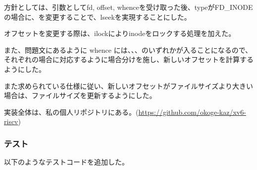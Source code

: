 \documentclass[platex,dvipdfmx, titlepage]{jlreq} %
\begin{document}
方針としては、引数としてfd, offset, whenceを受け取った後、typeがFD\_INODEの場合に、を変更することで、lseekを実現することにした。

オフセットを変更する際は、ilockによりinodeをロックする処理を加えた。

また、問題文にあるように whence には、、、のいずれかが入ることになるので、それぞれの場合に対応するように場合分けを施し、新しいオフセットを計算するようにした。

また求められている仕様に従い、新しいオフセットがファイルサイズより大きい場合は、ファイルサイズを更新するようにした。

実装全体は、私の個人リポジトリにある。(\url{https://github.com/okoge-kaz/xv6-riscv})

\subsubsection*{テスト}

以下のようなテストコードを追加した。
\end{document}
